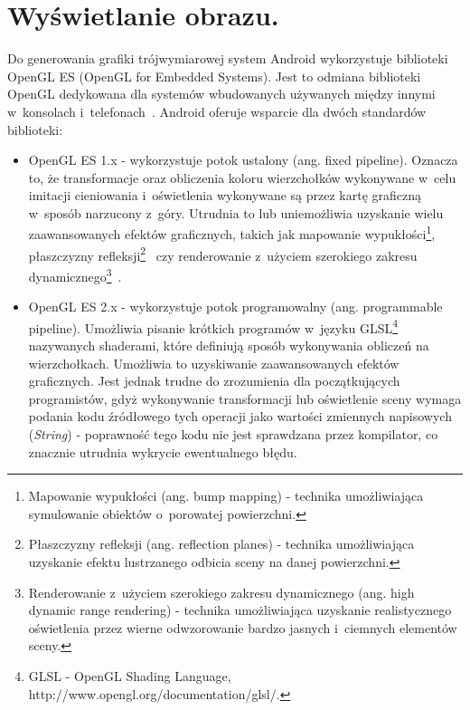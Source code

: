 \documentclass[a4paper,twocolumn,11pt]{article}
\begin{document}

\section{Wyświetlanie obrazu.} \label{sec:image_rendering}

Do generowania grafiki trójwymiarowej system Android wykorzystuje biblioteki OpenGL ES (OpenGL for Embedded Systems).
Jest to odmiana biblioteki OpenGL dedykowana dla systemów wbudowanych używanych między innymi w~konsolach i~telefonach~\cite{ogl:es}.
Android oferuje wsparcie dla dwóch standardów biblioteki:

\begin{itemize}
 \item OpenGL ES 1.x - wykorzystuje potok ustalony (ang. fixed pipeline).
  Oznacza to, że transformacje oraz obliczenia koloru wierzchołków wykonywane w~celu imitacji cieniowania i~oświetlenia wykonywane są przez kartę graficzną w~sposób narzucony z~góry.
  Utrudnia to lub uniemożliwia uzyskanie wielu zaawansowanych efektów graficznych, takich jak mapowanie wypukłości\footnote{Mapowanie wypukłości (ang. bump mapping) - technika umożliwiająca symulowanie obiektów o~porowatej powierzchni.}, płaszczyzny refleksji\footnote{Płaszczyzny refleksji (ang. reflection planes) - technika umożliwiająca uzyskanie efektu lustrzanego odbicia sceny na danej powierzchni.}~\cite{tec:3d} czy renderowanie z~użyciem szerokiego zakresu dynamicznego\footnote{Renderowanie z~użyciem szerokiego zakresu dynamicznego (ang. high dynamic range rendering) - technika umożliwiająca uzyskanie realistycznego oświetlenia przez wierne odwzorowanie bardzo jasnych i~ciemnych elementów sceny.}~\cite{nvi:hdr}. 
 \item OpenGL ES 2.x - wykorzystuje potok programowalny (ang. programmable pipeline).
  Umożliwia pisanie krótkich programów w~języku GLSL\footnote{GLSL - OpenGL Shading Language, http://www.opengl.org/documentation/glsl/.} nazywanych shaderami, które definiują sposób wykonywania obliczeń na wierzchołkach.
  Umożliwia to uzyskiwanie zaawansowanych efektów graficznych. Jest jednak trudne do zrozumienia dla początkujących programistów, gdyż wykonywanie transformacji lub oświetlenie sceny wymaga podania kodu źródłowego tych operacji jako wartości zmiennych napisowych (\emph{String}) - poprawność tego kodu nie jest sprawdzana przez kompilator, co znacznie utrudnia wykrycie ewentualnego błędu.
\end{itemize}
\end{document}
